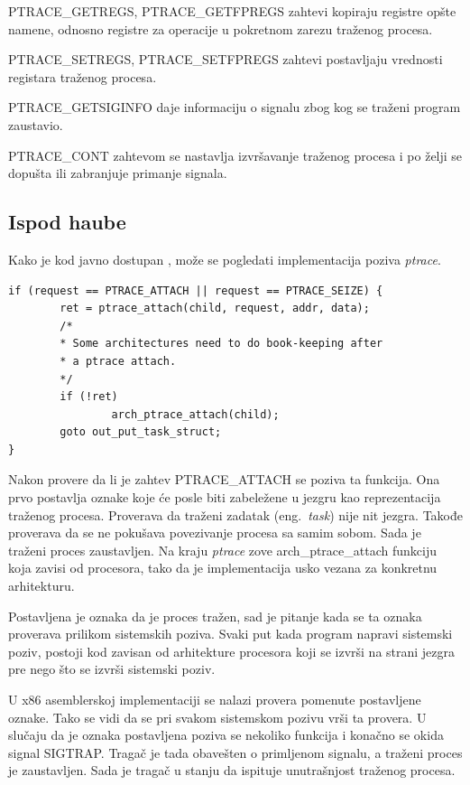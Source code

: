 \documentclass[a4paper]{article}
\begin{document}
PTRACE\_GETREGS, PTRACE\_GETFPREGS
    zahtevi kopiraju registre opšte namene, odnosno registre za operacije u pokretnom zarezu 
    traženog procesa.

PTRACE\_SETREGS, PTRACE\_SETFPREGS
    zahtevi postavljaju vrednosti registara traženog procesa.

PTRACE\_GETSIGINFO 
    daje informaciju o signalu zbog kog se traženi program zaustavio.

PTRACE\_CONT
    zahtevom se nastavlja izvršavanje traženog procesa i po želji se 
    dopušta ili zabranjuje primanje signala.
\subsection{Ispod haube}	

Kako je kod javno dostupan \cite{code}, može se pogledati implementacija poziva \emph{ptrace}.
\begin{verbatim}
if (request == PTRACE_ATTACH || request == PTRACE_SEIZE) {
        ret = ptrace_attach(child, request, addr, data);
        /*
        * Some architectures need to do book-keeping after
        * a ptrace attach.
        */
        if (!ret)
                arch_ptrace_attach(child);
        goto out_put_task_struct;
}
\end{verbatim}

Nakon provere da li je zahtev PTRACE\_ATTACH se poziva ta funkcija.
Ona prvo postavlja oznake koje će posle biti zabeležene u jezgru kao reprezentacija 
traženog procesa. Proverava da traženi zadatak (eng.~{\em task}) nije nit jezgra. 
Takođe proverava da se ne pokušava povezivanje procesa sa samim sobom.
Sada je traženi proces zaustavljen. Na kraju \emph{ptrace} zove arch\_ptrace\_attach funkciju koja zavisi
od procesora, tako da je implementacija usko vezana za konkretnu arhitekturu.

Postavljena je oznaka da je proces tražen, sad je pitanje kada se ta oznaka proverava prilikom 
sistemskih poziva. Svaki put kada program napravi sistemski poziv, postoji kod zavisan od arhitekture
procesora koji se izvrši na strani jezgra pre nego što se izvrši sistemski poziv.

U x86 asemblerskoj implementaciji se nalazi provera pomenute postavljene oznake\cite{blog}.
Tako se vidi da se pri svakom sistemskom pozivu vrši ta provera. 
U slučaju da je oznaka postavljena poziva se nekoliko funkcija i konačno se okida signal SIGTRAP.
Tragač je tada obavešten o primljenom signalu, a traženi proces je zaustavljen. 
Sada je tragač u stanju da ispituje unutrašnjost traženog procesa.
\end{document}
